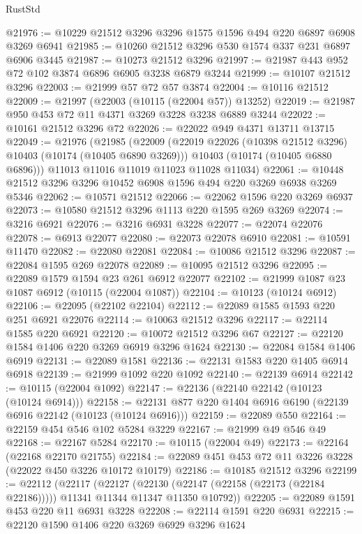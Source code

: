 \begin{lexlean}{RustStd}
\begin{coremodule}
@21976 := @10229 @21512 @3296 @3296 @1575 @1596 @494 @220 @6897 @6908 @3269 @6941
@21985 := @10260 @21512 @3296 @530 @1574 @337 @231 @6897 @6906 @3445
@21987 := @10273 @21512 @3296
@21997 := @21987 @443 @952 @72 @102 @3874 @6896 @6905 @3238 @6879 @3244
@21999 := @10107 @21512 @3296
@22003 := @21999 @57 @72 @57 @3874
@22004 := @10116 @21512
@22009 := @21997 (@22003 (@10115 (@22004 @57)) @13252)
@22019 := @21987 @950 @453 @72 @11 @4371 @3269 @3228 @3238 @6889 @3244
@22022 := @10161 @21512 @3296 @72
@22026 := @22022 @949 @4371 @13711 @13715
@22049 := @21976
    (@21985
      (@22009
        (@22019 @22026 (@10398 @21512 @3296) @10403 (@10174 (@10405 @6890 @3269)))
        @10403
        (@10174 (@10405 @6880 @6896)))
      @11013
      @11016
      @11019
      @11023
      @11028
      @11034)
@22061 := @10448 @21512 @3296 @3296 @10452 @6908 @1596 @494 @220 @3269 @6938 @3269 @5346
@22062 := @10571 @21512
@22066 := @22062 @1596 @220 @3269 @6937
@22073 := @10580 @21512 @3296 @1113 @220 @1595 @269 @3269
@22074 := @3216 @6921
@22076 := @3216 @6931 @3228
@22077 := @22074 @22076
@22078 := @6913 @22077
@22080 := @22073 @22078 @6910
@22081 := @10591 @11470
@22082 := @22080 @22081
@22084 := @10086 @21512 @3296
@22087 := @22084 @1595 @269 @22078
@22089 := @10095 @21512 @3296
@22095 := @22089 @1579 @1594 @23 @261 @6912 @22077
@22102 := @21999 @1087 @23 @1087 @6912 (@10115 (@22004 @1087))
@22104 := @10123 (@10124 @6912)
@22106 := @22095 (@22102 @22104)
@22112 := @22089 @1585 @1593 @220 @251 @6921 @22076
@22114 := @10063 @21512 @3296
@22117 := @22114 @1585 @220 @6921
@22120 := @10072 @21512 @3296 @67
@22127 := @22120 @1584 @1406 @220 @3269 @6919 @3296 @1624
@22130 := @22084 @1584 @1406 @6919
@22131 := @22089 @1581
@22136 := @22131 @1583 @220 @1405 @6914 @6918
@22139 := @21999 @1092 @220 @1092
@22140 := @22139 @6914
@22142 := @10115 (@22004 @1092)
@22147 := @22136 (@22140 @22142 (@10123 (@10124 @6914)))
@22158 := @22131 @877 @220 @1404 @6916 @6190 (@22139 @6916 @22142 (@10123 (@10124 @6916)))
@22159 := @22089 @550
@22164 := @22159 @454 @546 @102 @5284 @3229
@22167 := @21999 @49 @546 @49
@22168 := @22167 @5284
@22170 := @10115 (@22004 @49)
@22173 := @22164 (@22168 @22170 @21755)
@22184 := @22089 @451 @453 @72 @11 @3226 @3228 (@22022 @450 @3226 @10172 @10179)
@22186 := @10185 @21512 @3296
@22199 := @22112
    (@22117
      (@22127
        (@22130 (@22147 (@22158 (@22173 (@22184 @22186)))))
        @11341
        @11344
        @11347
        @11350
        @10792))
@22205 := @22089 @1591 @453 @220 @11 @6931 @3228
@22208 := @22114 @1591 @220 @6931
@22215 := @22120 @1590 @1406 @220 @3269 @6929 @3296 @1624

\end{coremodule}
\end{lexlean}
